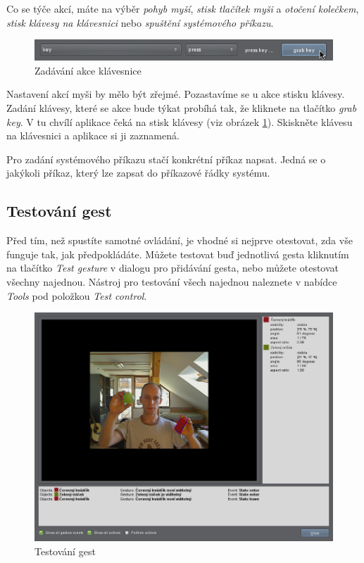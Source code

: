 Co se týče akcí, máte na výběr \emph{pohyb myší}, \emph{stisk tlačítek myši} a
\emph{otočení kolečkem}, \emph{stisk klávesy na klávesnici} nebo
\emph{spuštění systémového příkazu}.

\begin{figure}[H]
\centering
\includegraphics[width=1.1\textwidth]{keyaction.png}
\caption{Zadávání akce klávesnice}
\label{fig:keyaction}
\end{figure}

Nastavení akcí myši by mělo být zřejmé. Pozastavíme se u akce stisku klávesy.
Zadání klávesy, které se akce bude týkat probíhá tak, že kliknete na tlačítko
\emph{grab key}. V tu chvílí aplikace čeká na stisk klávesy (viz obrázek
\ref{fig:keyaction}). Skiskněte klávesu na klávesnici a aplikace si ji zaznamená.

Pro zadání systémového příkazu stačí konkrétní příkaz napsat. Jedná se o
jakýkoli příkaz, který lze zapsat do příkazové řádky systému.

\subsection{Testování gest}
Před tím, než spustíte samotné ovládání, je vhodné si nejprve otestovat, zda
vše funguje tak, jak předpokládáte. Můžete testovat buď jednotlivá gesta
kliknutím na tlačítko \emph{Test gesture} v dialogu pro přidávání gesta, nebo
můžete otestovat všechny najednou. Nástroj pro testování všech najednou
naleznete v nabídce \emph{Tools} pod položkou \emph{Test control}.

\begin{figure}[H]
\centering
\includegraphics[width=1.1\textwidth]{testgestures.png}
\caption{Testování gest}
\label{fig:testgestures}
\end{figure}

